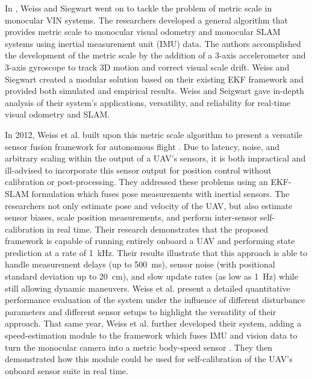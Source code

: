 In \cite{Weiss2011_2}, Weiss and Siegwart went on to tackle the problem of metric scale in monocular VIN systems. The researchers developed a general algorithm that provides metric scale to monocular visual odometry and monocular SLAM systems using inertial measurement unit (IMU) data. The authors accomplished the development of the metric scale by the addition of a 3-axis accelerometer and 3-axis gyroscope to track 3D motion and correct visual scale drift. Weiss and Siegwart created a modular solution based on their existing EKF framework and provided both simulated and empirical results. Weiss and Seigwart gave in-depth analysis of their system's applications, versatility, and reliability for real-time visual odometry and SLAM. 

In 2012, Weiss et al. built upon this metric scale algorithm to present a versatile sensor fusion framework for autonomous flight \cite{Weiss2012}. Due to latency, noise, and arbitrary scaling within the output of a UAV's sensors, it is both impractical and ill-advised to incorporate this sensor output for position control without calibration or post-processing. They addressed these problems using an EKF-SLAM formulation which fuses pose measurements with inertial sensors. The researchers not only estimate pose and velocity of the UAV, but also estimate sensor biases, scale position measurements, and perform inter-sensor self-calibration in real time. Their research demonstrates that the proposed framework is capable of running entirely onboard a UAV and performing state prediction at a rate of 1~kHz. Their results illustrate that this approach is able to handle measurement delays (up to 500~ms), sensor noise (with positional standard deviation up to 20~cm), and slow update rates (as low as 1~Hz) while still allowing dynamic maneuvers. Weiss et al. present a detailed quantitative performance evaluation of the system under the influence of different disturbance parameters and different sensor setups to highlight the versatility of their approach. That same year, Weiss et al. further developed their system, adding a speed-estimation module to the framework which fuses IMU and vision data to turn the monocular camera into a metric body-speed sensor \cite{Weiss2012_2}. They then demonstrated how this module could be used for self-calibration of the UAV's onboard sensor suite in real time.

